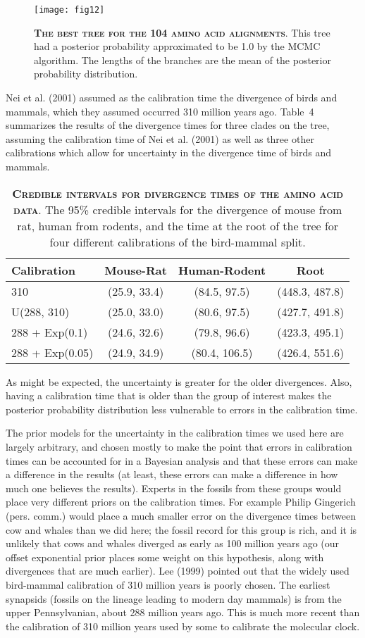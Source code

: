 \documentclass{svmult}
\begin{document}
\begin{figure}[b]
\centering
\texttt{[image: fig12]}
\caption{\textbf{\textsc{The best tree for the 104 amino acid alignments}}.
This tree had a posterior probability approximated to be 1.0 by the MCMC algorithm. The lengths of the branches are the mean of the posterior
probability distribution.}
\label{fig12}
\end{figure}
Nei et al. (2001) assumed as the calibration time the divergence of birds and mammals, which they assumed occurred 310 million years ago. Table~4 summarizes the results
of the divergence times for three clades on the tree, assuming the calibration time of Nei et al. (2001) as well as three other calibrations which allow for uncertainty in the
divergence time of birds and mammals.
\begin{table}[t]
\centering
\caption{\textbf{\textsc{Credible intervals for divergence times of the amino acid data}}.
The 95\% credible intervals for the divergence of mouse from rat, human from rodents, and the time at
the root of the tree for four different calibrations of the bird-mammal split.}
\begin{tabular}{l c c c} \hline
Calibration & Mouse-Rat & Human-Rodent & Root \\ \hline
310 & (25.9, 33.4) & (84.5, 97.5) & (448.3, 487.8) \\
U(288, 310) & (25.0, 33.0) & (80.6, 97.5) & (427.7, 491.8) \\
288 + Exp(0.1) & (24.6, 32.6) & (79.8, 96.6) & (423.3, 495.1) \\
288 + Exp(0.05) & (24.9, 34.9) & (80.4, 106.5) & (426.4, 551.6) \\ 
\hline
\end{tabular}
\label{tab4}
\end{table}
As might be expected, the uncertainty is greater for the older divergences. Also, having a calibration time that is older than the group
of interest makes the posterior probability distribution less vulnerable to errors in the calibration time.

The prior models for the uncertainty in the calibration times we used here are largely arbitrary, and chosen mostly to make the point that
errors in calibration times can be accounted for in a Bayesian analysis and that these errors can make a difference in the results (at least, these errors can
make a difference in how much one believes the results). Experts in the fossils from these groups would place very different priors on
the calibration times. For example Philip Gingerich (pers. comm.) would place a much smaller error on the divergence times between
cow and whales than we did here; the fossil record for this group is rich, and it is unlikely that cows and whales diverged as early as 100 million
years ago (our offset exponential prior places some weight on this hypothesis, along with divergences that are much earlier).
Lee (1999) pointed out that the widely used bird-mammal calibration of 310 million years is poorly chosen. The earliest synapsids (fossils
on the lineage leading to modern day mammals) is from the upper Pennsylvanian, about 288 million years ago. This is much more recent than
the calibration of 310 million years used by some to calibrate the molecular clock. 
\end{document}
